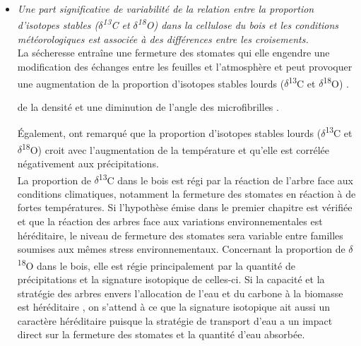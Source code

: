\documentclass{report}
\newcommand{\Ctreize}{$\delta$\textsuperscript{13}C\xspace}
\newcommand{\Odixhuit}{$\delta$\textsuperscript{18}O\xspace}
\begin{document}
\begin{itemize}
	\item \emph{Une part significative de variabilité de la relation entre la proportion d'isotopes stables (\Ctreize et \Odixhuit) dans la cellulose du bois et les conditions météorologiques est associée à des différences entre les croisements.} \\
		
	La sécheresse entraîne une fermeture des stomates \citep{Farquhar1989, Farquhar1993, Nicolas2017} qui elle engendre une modification des échanges entre les feuilles et l'atmosphère et peut provoquer une augmentation de la proportion d'isotopes stables lourds (\Ctreize et \Odixhuit) \citep{McCarroll2004,Skomarkova2006,Vaganov2009,Cernusak2015}.
	
	 de la densité \citep{Drew2009, Rozas2011, Wilkinson2015}
	 et une diminution de l'angle des microfibrilles \citep{Xu2012}. %
	 
	 
	 Également, \cite{Seftigen2011} ont remarqué que la proportion d'isotopes stables lourds (\Ctreize et \Odixhuit) croit avec l'augmentation de la température et qu'elle est corrélée négativement aux précipitations. \\
	
	La proportion de \Ctreize dans le bois est régi par la réaction de l'arbre face aux conditions climatiques, notamment la fermeture des stomates en %
	réaction à de fortes températures. Si l'hypothèse émise dans le premier chapitre est vérifiée et que la réaction des arbres face aux variations environnementales est héréditaire, le niveau de fermeture des stomates sera variable entre familles soumises aux mêmes stress environnementaux. Concernant la proportion de \Odixhuit dans le bois, elle est régie principalement par la quantité de précipitations et la signature isotopique de celles-ci. Si la capacité et la stratégie des arbres envers l'allocation de l'eau et du carbone à la biomasse est héréditaire \citep{Espinoza2014}, on s'attend à ce que la signature isotopique ait aussi un caractère héréditaire puisque la stratégie de transport d'eau a un impact direct sur la fermeture des stomates et la quantité d'eau absorbée. %
	

\end{itemize}
\end{document}
